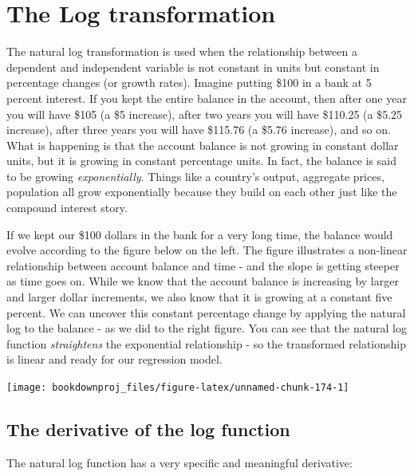 \documentclass[
]{book}
\begin{document}
\hypertarget{the-log-transformation}{%
\section{The Log transformation}\label{the-log-transformation}}

The natural log transformation is used when the relationship between a dependent and independent variable is not constant in units but constant in percentage changes (or growth rates). Imagine putting \$100 in a bank at 5 percent interest. If you kept the entire balance in the account, then after one year you will have \$105 (a \$5 increase), after two years you will have \$110.25 (a \$5.25 increase), after three years you will have \$115.76 (a \$5.76 increase), and so on. What is happening is that the account balance is not growing in constant dollar units, but it is growing in constant percentage units. In fact, the balance is said to be growing \emph{exponentially}. Things like a country's output, aggregate prices, population all grow exponentially because they build on each other just like the compound interest story.

If we kept our \$100 dollars in the bank for a very long time, the balance would evolve according to the figure below on the left. The figure illustrates a non-linear relationship between account balance and time - and the slope is getting steeper as time goes on. While we know that the account balance is increasing by larger and larger dollar increments, we also know that it is growing at a constant five percent. We can uncover this constant percentage change by applying the natural log to the balance - as we did to the right figure. You can see that the natural log function \emph{straightens} the exponential relationship - so the transformed relationship is linear and ready for our regression model.

\begin{center}\texttt{[image: bookdownproj\_files/figure-latex/unnamed-chunk-174-1]} \end{center}

\hypertarget{the-derivative-of-the-log-function}{%
\subsection*{The derivative of the log function}\label{the-derivative-of-the-log-function}}

The natural log function has a very specific and meaningful derivative:
\end{document}

